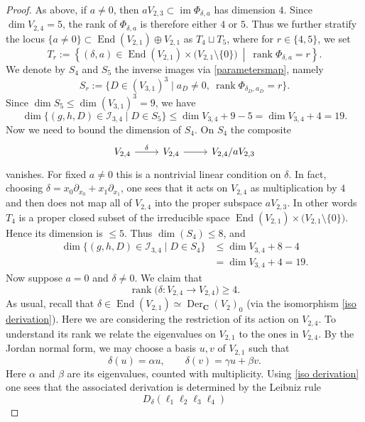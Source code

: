 \documentclass[10pt,a4paper]{amsart}
\providecommand{\CC}{\mathbf{C}}
\DeclareMathOperator{\rank}{rank}
\numberwithin{equation}{section}
\theoremstyle{plain}
\theoremstyle{definition}
\theoremstyle{plain}
\theoremstyle{definition}
\begin{document}
\begin{proof}
As above, if $a\ne0$, then $aV_{2,3}\subset\operatorname{im}\Phi_{\delta,a}$ has dimension $4$. Since $\dim V_{2,4}=5$, the rank of $\Phi_{\delta,a}$ is therefore either $4$ or $5$. Thus we further stratify the locus $\{a \neq 0\}\subset \operatorname{End}(V_{2,1}) \oplus V_{2,1} $ as $T_4 \sqcup T_5$,
where for $r\in\{4,5\}$,  we set
\[
T_r:=
\left\{
(\delta,a)\in
\operatorname{End}(V_{2,1})\times
\bigl(V_{2,1}\setminus\{0\}\bigr)
\ \middle|\
\rank\Phi_{\delta,a}=r
\right\}.
\]
We denote by $S_4$ and $S_5$ the inverse images via \eqref{parametersmap}, namely
\[
   S_r:=\{D\in(V_{3,1})^3\mid a_D\ne0,\
   \rank\Phi_{\delta_D,a_D}=r\}.
\]
Since $\dim S_5\leq \operatorname{dim}(V_{3,1})^3=9$, we have
\[
   \dim\{(g,h,D) \in \mathcal{I}_{3,4}\mid D\in S_5\}
   \le\dim V_{3,4}+9-5=\dim V_{3,4}+4=19.
\]
Now we need to bound the dimension of $S_4$. On $S_4$ the composite
\[
\begin{tikzcd}
V_{2,4} \arrow[r, "\delta"] & V_{2,4} \arrow[r] & V_{2,4}/aV_{2,3}
\end{tikzcd}
\]
vanishes. For fixed $a\ne0$ this is a nontrivial linear condition on $\delta$. In fact, choosing $\delta=x_0\partial_{x_0}+x_1\partial_{x_1}$,  one sees that it acts on $V_{2,4}$ as multiplication by $4$ and then does not
map all of $V_{2,4}$ into the proper subspace $aV_{2,3}$. In other words $T_4$ is a proper closed subset of the irreducible space $\operatorname{End}(V_{2,1})\times
\bigl(V_{2,1}\setminus\{0\})$. Hence its dimension is $\leq 5$. Thus $\operatorname{dim}(S_4) \leq 8$, and 
\begin{align*}
   \dim\{(g,h,D) \in \mathcal{I}_{3,4} \mid D\in S_4\}
   &\le\dim V_{3,4}+8-4\\
   &=\dim V_{3,4}+4=19.
\end{align*}
Now suppose \(a=0\) and \(\delta\neq0\). We claim that
\[
\rank\bigl(\delta\colon V_{2,4}\longrightarrow V_{2,4}\bigr)\ge4.
\]
As usual, recall that  $\delta  \in \operatorname{End}(V_{2,1}) \simeq \operatorname{Der}_{\CC}(V_2)_0$ (via the isomorphism \eqref{iso derivation}). Here we are considering the restriction of its action on $V_{2,4}$. To understand its  rank we relate the eigenvalues on  $V_{2,1}$ to the ones in $V_{2,4}$.  By the Jordan normal form, we may choose a basis \(u,v\) of
\(V_{2,1}\) such that
\[
\delta(u)=\alpha u,
\qquad
\delta(v)=\gamma u+\beta v.
\]
Here  \(\alpha\) and \(\beta\) are its eigenvalues, counted with
multiplicity. Using \eqref{iso derivation} one sees that  the associated derivation is determined by the Leibniz
rule
\[
D_\delta(\ell_1\ell_2\ell_3\ell_4)
\]
\end{proof}
\end{document}
